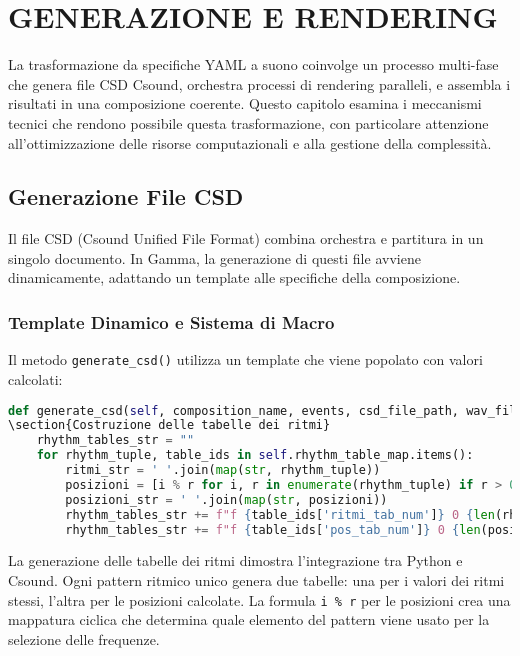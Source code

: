 
\section{GENERAZIONE E RENDERING}
La trasformazione da specifiche YAML a suono coinvolge un processo multi-fase che genera file CSD Csound, orchestra processi di rendering paralleli, e assembla i risultati in una composizione coerente. Questo capitolo esamina i meccanismi tecnici che rendono possibile questa trasformazione, con particolare attenzione all'ottimizzazione delle risorse computazionali e alla gestione della complessità.
\subsection{Generazione File CSD}
Il file CSD (Csound Unified File Format) combina orchestra e partitura in un singolo documento. In Gamma, la generazione di questi file avviene dinamicamente, adattando un template alle specifiche della composizione.
\subsubsection{Template Dinamico e Sistema di Macro}
Il metodo \texttt{generate\_csd()} utilizza un template che viene popolato con valori calcolati:

\begin{lstlisting}[language=Python]
def generate_csd(self, composition_name, events, csd_file_path, wav_file_path):
\section{Costruzione delle tabelle dei ritmi}
    rhythm_tables_str = ""
    for rhythm_tuple, table_ids in self.rhythm_table_map.items():
        ritmi_str = ' '.join(map(str, rhythm_tuple))
        posizioni = [i % r for i, r in enumerate(rhythm_tuple) if r > 0]
        posizioni_str = ' '.join(map(str, posizioni))
        rhythm_tables_str += f"f {table_ids['ritmi_tab_num']} 0 {len(rhythm_tuple)} -2 {ritmi_str}\n"
        rhythm_tables_str += f"f {table_ids['pos_tab_num']} 0 {len(posizioni)} -2 {posizioni_str}\n"
\end{lstlisting}

La generazione delle tabelle dei ritmi dimostra l'integrazione tra Python e Csound. Ogni pattern ritmico unico genera due tabelle: una per i valori dei ritmi stessi, l'altra per le posizioni calcolate. La formula \texttt{i \% r} per le posizioni crea una mappatura ciclica che determina quale elemento del pattern viene usato per la selezione delle frequenze.

